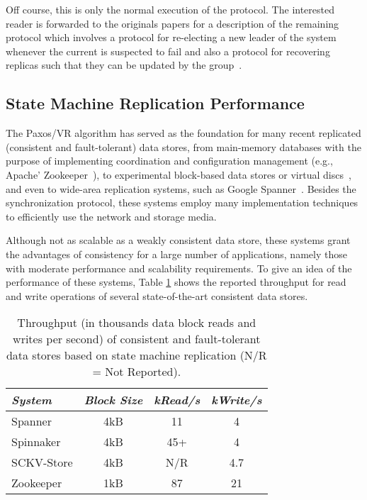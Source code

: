Off course,  this is only the normal execution of the protocol. 
The interested reader is forwarded to the originals papers for a description of the remaining protocol which involves a protocol for re-electing a new leader of the system whenever the current is suspected to fail and also a protocol for recovering replicas such that they can be updated by the group~\cite{Liskov:2012ut,Liskov:2010vt}. 



\subsection{State Machine Replication Performance}
\label{sec:related:state-mach-repl}
The Paxos/VR algorithm has served as the foundation for many recent replicated (consistent and fault-tolerant) data stores, from main-memory databases with the purpose of implementing coordination and configuration management (e.g., Apache'  Zookeeper~\cite{Hun10}), to experimental block-based data stores or virtual discs~\cite{Rao11,Bol11,Bes13}, and even to wide-area replication systems, such as Google Spanner~\cite{Corbett:2012uz}.
Besides the synchronization protocol, these systems employ many implementation techniques to efficiently use the network and storage media.

Although not as scalable as a weakly consistent data store, these systems grant the advantages of consistency for a large number of applications, namely those with moderate performance and scalability requirements. To give an idea of the performance of these systems, Table \ref{table:smr-results} shows the reported throughput for read and write operations of several state-of-the-art consistent data stores.

\begin{table}[ht]
  \center
    \begin{tabular}{ lccc}
    \hline
    \emph{System} & \emph{Block Size} & \emph{kRead/s} & \emph{kWrite/s} \\ \toprule
    Spanner \cite{Corbett:2012uz} & 4kB & 11 & 4 \\ 
    Spinnaker \cite{Rao11} & 4kB & 45+ & 4 \\  
    SCKV-Store \cite{Bes13} & 4kB & N/R & 4.7 \\ 
    Zookeeper \cite{Hun10} & 1kB & 87 & 21 \\ \bottomrule 
    \end{tabular}
  \caption[Performance of state machine replication systems]{Throughput (in thousands data block reads and writes per second) of consistent and fault-tolerant data stores based on state machine replication (N/R = Not Reported).}
  \label{table:smr-results}
\end{table}

